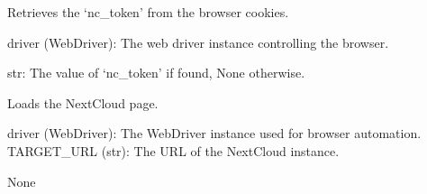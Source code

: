 \documentclass[letterpaper,10pt,english]{sphinxmanual}
\begin{document}

\begin{fulllineitems}
\label{\detokenize{utils:utils.authentication_management.get_token_from_cookies}}
\pysigstartsignatures
{}
\pysigstopsignatures
\sphinxAtStartPar
Retrieves the ‘nc\_token’ from the browser cookies.
\begin{description}
\sphinxAtStartPar
driver (WebDriver): The web driver instance controlling the browser.

\sphinxAtStartPar
str: The value of ‘nc\_token’ if found, None otherwise.

\end{description}

\end{fulllineitems}


\begin{fulllineitems}
\label{\detokenize{utils:utils.authentication_management.green_text}}
\pysigstartsignatures
{}
\pysigstopsignatures
\end{fulllineitems}


\begin{fulllineitems}
\label{\detokenize{utils:utils.authentication_management.load_nextcloud_page}}
\pysigstartsignatures
{}
\pysigstopsignatures
\sphinxAtStartPar
Loads the NextCloud page.
\begin{description}
\sphinxAtStartPar
driver (WebDriver): The WebDriver instance used for browser automation.
TARGET\_URL (str): The URL of the NextCloud instance.

\sphinxAtStartPar
None

\end{description}

\end{fulllineitems}
\end{document}
